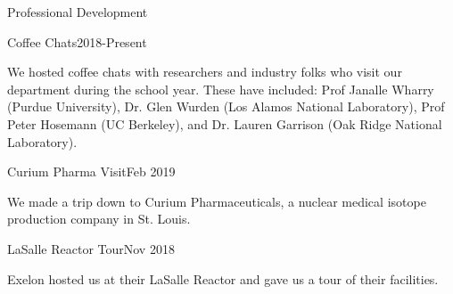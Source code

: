 \documentclass{resume2} %
\begin{document}
\begin{rSection}{Professional Development}
	\begin{rSubsection}{Coffee Chats}{2018-Present}{}{}
		\item We hosted coffee chats with researchers and industry folks who
		visit our department during the school year. These have included:
		Prof Janalle Wharry (Purdue University),
		Dr. Glen Wurden (Los Alamos National Laboratory),
		Prof Peter Hosemann (UC Berkeley),
		and Dr. Lauren Garrison (Oak Ridge National Laboratory).
	\end{rSubsection}
	\begin{rSubsection}{Curium Pharma Visit}{Feb 2019}{}{}
		\item We made a trip down to Curium Pharmaceuticals,
		a nuclear medical isotope production company in St. Louis.
	\end{rSubsection}
	\begin{rSubsection}{LaSalle Reactor Tour}{Nov 2018}{}{}
		\item Exelon hosted us at their LaSalle Reactor and gave us a
		tour of their facilities.
	\end{rSubsection}
\end{rSection}


\end{document}
